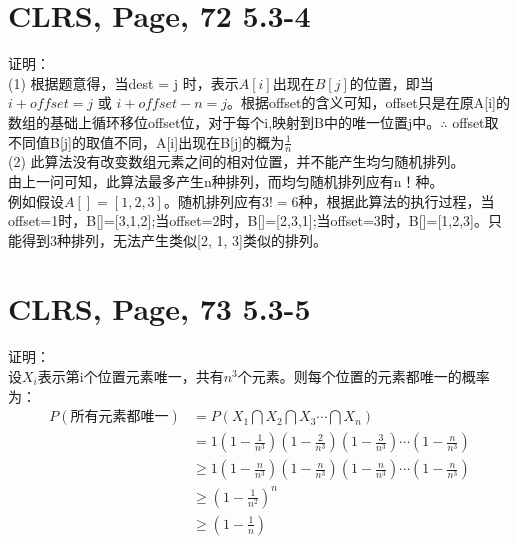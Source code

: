 \documentclass[UTF8]{ctexart}
\begin{document}
\section{CLRS, Page, 72 5.3-4}

证明：\\
(1) 根据题意得，当dest = j 时，表示$A[i]$出现在$B[j]$的位置，即当$i+offset = j$ 或 $i+offset-n = j$。根据offset的含义可知，offset只是在原A[i]的数组的基础上循环移位offset位，对于每个i,映射到B中的唯一位置j中。$\therefore$ offset取不同值B[j]的取值不同，A[i]出现在B[j]的概为$\frac{1}{n}$ \\
(2) 此算法没有改变数组元素之间的相对位置，并不能产生均匀随机排列。\\
由上一问可知，此算法最多产生n种排列，而均匀随机排列应有n！种。\\
例如假设$A[]={[1,2,3]}$。随机排列应有$3!=6$种，根据此算法的执行过程，当offset=1时，B[]=[3,1,2];当offset=2时，B[]=[2,3,1];当offset=3时，B[]=[1,2,3]。只能得到3种排列，无法产生类似[2, 1, 3]类似的排列。


\section{CLRS, Page, 73 5.3-5}

证明： \\
设$X_i$表示第i个位置元素唯一，共有$n^3$个元素。则每个位置的元素都唯一的概率为：
\begin{align*}
    P(\text{所有元素都唯一}) &= P(X_1\bigcap X_2\bigcap X_3 \cdots \bigcap X_n) \\
        &= 1(1-\frac{1}{n^3})(1-\frac{2}{n^3})(1-\frac{3}{n^3})\cdots(1-\frac{n}{n^3})\\
        &\geq 1(1-\frac{n}{n^3})(1-\frac{n}{n^3})(1-\frac{n}{n^3})\cdots(1-\frac{n}{n^3})\\
        &\geq (1-\frac{1}{n^2})^n\\
        &\geq (1-\frac{1}{n})
\end{align*}
\end{document}
